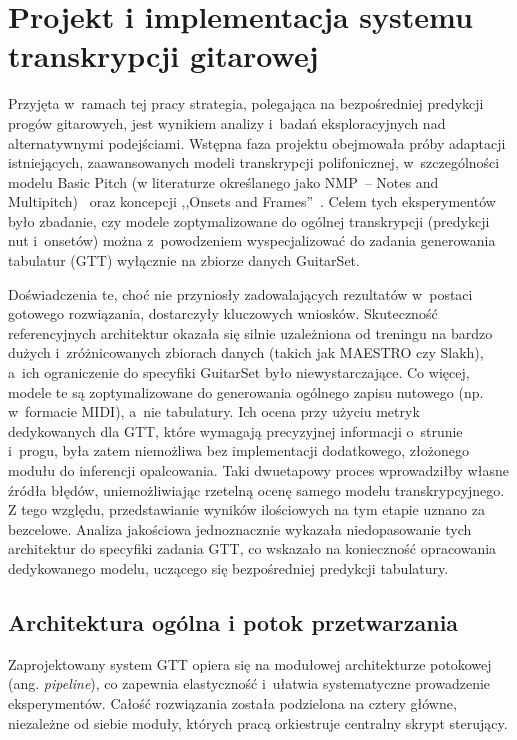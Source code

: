 \chapter{Projekt i implementacja systemu transkrypcji gitarowej}
\label{chap:przedmiot_pracy}

Przyjęta w~ramach tej pracy strategia, polegająca na bezpośredniej predykcji progów gitarowych, jest wynikiem analizy i~badań eksploracyjnych nad alternatywnymi podejściami. Wstępna faza projektu obejmowała próby adaptacji istniejących, zaawansowanych modeli transkrypcji polifonicznej, w~szczególności modelu Basic Pitch (w literaturze określanego jako NMP~– Notes and Multipitch)~\autocite{Bittner2022BasicPitch} oraz koncepcji ,,Onsets and Frames''~\autocite{Hawthorne2018Onsets}. Celem tych eksperymentów było zbadanie, czy modele zoptymalizowane do ogólnej transkrypcji (predykcji nut i~onsetów) można z~powodzeniem wyspecjalizować do zadania generowania tabulatur (GTT) wyłącznie na zbiorze danych GuitarSet.

Doświadczenia te, choć nie przyniosły zadowalających rezultatów w~postaci gotowego rozwiązania, dostarczyły kluczowych wniosków. Skuteczność referencyjnych architektur okazała się silnie uzależniona od treningu na bardzo dużych i~zróżnicowanych zbiorach danych (takich jak MAESTRO czy Slakh), a~ich ograniczenie do specyfiki GuitarSet było niewystarczające. Co więcej, modele te są zoptymalizowane do generowania ogólnego zapisu nutowego (np. w~formacie MIDI), a~nie tabulatury. Ich ocena przy użyciu metryk dedykowanych dla GTT, które wymagają precyzyjnej informacji o~strunie i~progu, była zatem niemożliwa bez implementacji dodatkowego, złożonego modułu do inferencji opalcowania. Taki dwuetapowy proces wprowadziłby własne źródła błędów, uniemożliwiając rzetelną ocenę samego modelu transkrypcyjnego. Z tego względu, przedstawianie wyników ilościowych na tym etapie uznano za bezcelowe. Analiza jakościowa jednoznacznie wykazała niedopasowanie tych architektur do specyfiki zadania GTT, co wskazało na konieczność opracowania dedykowanego modelu, uczącego się bezpośredniej predykcji tabulatury.

\section{Architektura ogólna i potok przetwarzania}
\label{sec:architektura_ogolna}

Zaprojektowany system GTT opiera się na modułowej architekturze potokowej (ang. \textit{pipeline}), co zapewnia elastyczność i~ułatwia systematyczne prowadzenie eksperymentów. Całość rozwiązania została podzielona na cztery główne, niezależne od siebie moduły, których pracą orkiestruje centralny skrypt sterujący.

